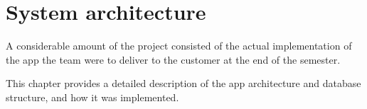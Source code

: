 \chapter{System architecture}

A considerable amount of the project consisted of the actual implementation of the app the team were to deliver to the customer at the end of the semester. 

This chapter provides a detailed description of the app architecture and database structure, and how it was implemented.




